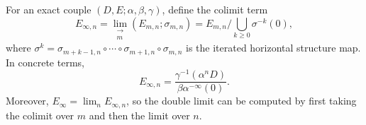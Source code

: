 \begin{definition}
For an exact couple $(D, E; \alpha, \beta, \gamma)$, define the colimit term
\[
E_{\infty,n} = \lim_{\substack{\longrightarrow \\ m}} (E_{m,n}; \sigma_{m,n}) = E_{m,n} \Big/ \bigcup_{k \geq 0} \sigma^{-k}(0),
\tag{4.25}
\]
where $\sigma^{k} = \sigma_{m+k-1,n} \circ \cdots \circ \sigma_{m+1,n} \circ \sigma_{m,n}$ is the iterated horizontal structure map. In concrete terms,
\[
E_{\infty,n} = \frac{\gamma^{-1}(\alpha^{n} D)}{\beta\alpha^{-\infty}(0)}.
\tag{4.26}
\]
Moreover, $E_{\infty} = \lim_{n} E_{\infty,n}$, so the double limit can be computed by first taking the colimit over $m$ and then the limit over $n$.
\end{definition}
